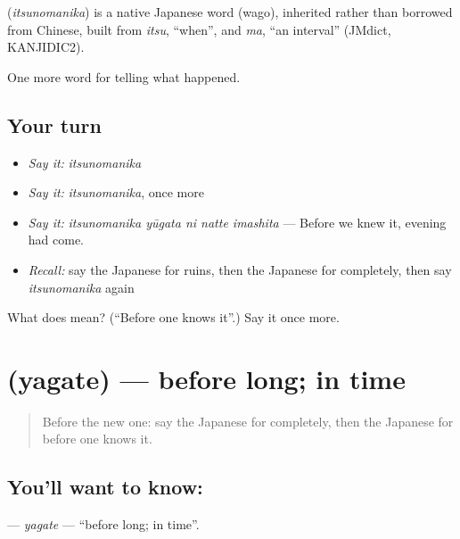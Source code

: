 \begin{cousinweb}
\textbf{} (\emph{itsunomanika}) is a native Japanese word (wago), inherited rather than borrowed from Chinese, built from \emph{itsu}, \textquotedblleft{}when\textquotedblright{}, and \emph{ma}, \textquotedblleft{}an interval\textquotedblright{} (JMdict, KANJIDIC2).
\end{cousinweb}

\begin{grammarlens}[title={What you've built}]
One more word for telling what happened.
\end{grammarlens}

\subsection*{Your turn}
\begin{itemize}
\raggedright
  \item \emph{Say it:} \emph{itsunomanika}
  \item \emph{Say it:} \emph{itsunomanika}, once more
  \item \emph{Say it:} \emph{itsunomanika yūgata ni natte imashita} — Before we knew it, evening had come.
  \item \emph{Recall:} say the Japanese for ruins, then the Japanese for completely, then say \emph{itsunomanika} again
\end{itemize}

\begin{tcolorbox}[breakable,colback=teal!4,colframe=teal!35!black,title={Before you move on}]
What does  mean? (\textquotedblleft{}Before one knows it\textquotedblright{}.) Say it once more.
\end{tcolorbox}
\section[\texorpdfstring{\ja{やがて} (yagate)}{やがて (yagate)}]{ (yagate) — before long; in time}

\label{lesson:JA-C314-yagate}



\begin{quote}
Before the new one: say the Japanese for completely, then the Japanese for before one knows it.
\end{quote}

\subsection*{You'll want to know: }
\textbf{} — \emph{yagate} — \textquotedblleft{}before long; in time\textquotedblright{}.

